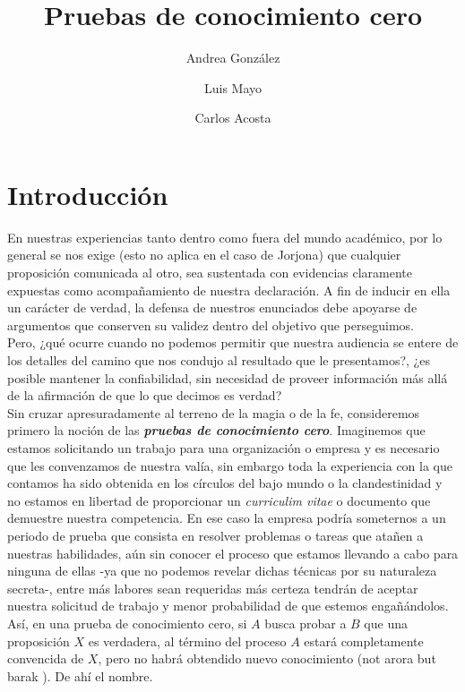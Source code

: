 \documentclass[oneside,10pt]{article}
\begin{document}
\author{Andrea González \and Luis Mayo \and Carlos Acosta}
\title{Pruebas de conocimiento cero}
\maketitle

\tableofcontents
\newpage 

\section{Introducción}
En nuestras experiencias tanto dentro como fuera del mundo académico,
por lo general se nos exige (esto no aplica en el caso de Jorjona) que
cualquier proposición comunicada al otro, sea sustentada con evidencias
claramente expuestas como acompañamiento de nuestra declaración. A fin de
inducir en ella un carácter de verdad, la defensa de nuestros enunciados
debe apoyarse de argumentos que conserven su validez dentro del objetivo que
perseguimos. \\
Pero, ¿qué ocurre cuando
no podemos permitir que nuestra audiencia se entere de los detalles
del camino que nos condujo al resultado que le presentamos?, ¿es posible
mantener la confiabilidad, sin necesidad de proveer información más allá
de la afirmación de que lo que decimos es verdad?\\
Sin cruzar apresuradamente al terreno de la magia o de la fe, consideremos primero
la noción de las \textit{\textbf{pruebas de conocimiento cero}}.
Imaginemos que estamos solicitando un trabajo para una organización o empresa y es
necesario que les convenzamos de nuestra valía, sin embargo toda la experiencia con
la que contamos ha sido obtenida en los círculos del bajo mundo o la clandestinidad y no
estamos en libertad de proporcionar un \textit{curriculim vitae} o documento que demuestre nuestra
competencia. En ese caso la empresa podría someternos a un periodo de prueba que consista en
resolver problemas o tareas que atañen a nuestras habilidades, aún sin conocer el proceso
que estamos llevando a cabo para ninguna de ellas -ya que no podemos revelar dichas técnicas por su
naturaleza secreta-, entre más labores sean requeridas
más certeza tendrán de aceptar nuestra solicitud de trabajo y menor probabilidad de que estemos
engañándolos.\\
Así, en una prueba de conocimiento cero, si $A$ busca probar a $B$ que una proposición $X$ es verdadera, al término del proceso $A$ estará completamente convencida de $X$, pero no habrá obtendido nuevo conocimiento (not arora but barak \cite{arora}). De ahí el nombre.
\end{document}
